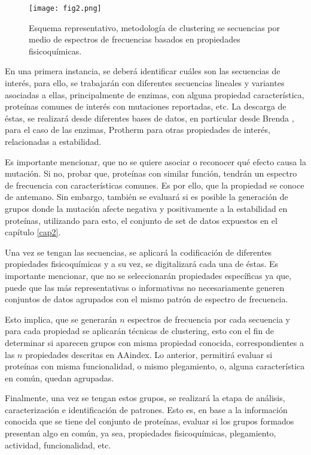 \begin{figure}[!h]
	
	\centering
	\texttt{[image: fig2.png]}
	\caption{Esquema representativo, metodología de clustering se secuencias por medio de espectros de frecuencias basados en propiedades fisicoquímicas.}
	\label{cap3:fig2}
\end{figure}

En una primera instancia, se deberá identificar cuáles son las secuencias de interés, para ello, se trabajarán con diferentes secuencias lineales y variantes asociadas a ellas, principalmente de enzimas, con alguna propiedad característica, proteínas comunes de interés con mutaciones reportadas, etc. La descarga de éstas, se realizará desde diferentes bases de datos, en particular desde Brenda \cite{schomburg2004brenda}, para el caso de las enzimas, Protherm \cite{bava2004protherm} para otras propiedades de interés, relacionadas a estabilidad. 

Es importante mencionar, que no se quiere asociar o reconocer qué efecto causa la mutación. Si no, probar que, proteínas con similar función, tendrán un espectro de frecuencia con características comunes. Es por ello, que la propiedad se conoce de antemano. Sin embargo, también se evaluará si es posible la generación de grupos donde la mutación afecte negativa y positivamente a la estabilidad en proteínas, utilizando para esto, el conjunto de set de datos expuestos en el capítulo \ref{cap2}.

Una vez se tengan las secuencias, se aplicará la codificación de diferentes propiedades fisicoquímicas y a su vez, se digitalizará cada una de éstas. Es importante mencionar, que no se seleccionarán propiedades específicas ya que, puede que las más representativas o informativas no necesariamente generen conjuntos de datos agrupados con el mismo patrón de espectro de frecuencia. 

Esto implica, que se generarán $n$ espectros de frecuencia por cada secuencia y para cada propiedad se aplicarán técnicas de clustering, esto con el fin de determinar si aparecen grupos con misma propiedad conocida, correspondientes a las $n$ propiedades descritas en AAindex. Lo anterior, permitirá evaluar si proteínas con misma funcionalidad, o mismo plegamiento, o, alguna característica en común, quedan agrupadas.

Finalmente, una vez se tengan estos grupos, se realizará la etapa de análisis, caracterización e identificación de patrones. Esto es, en base a la información conocida que se tiene del conjunto de proteínas, evaluar si los grupos formados presentan algo en común, ya sea, propiedades fisicoquímicas, plegamiento, actividad, funcionalidad, etc. 

